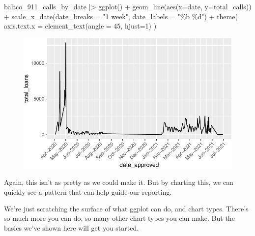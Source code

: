 \documentclass[
  letterpaper,
  DIV=11,
  numbers=noendperiod]{scrreprt}
\newenvironment{Shaded}{\begin{snugshade}}{\end{snugshade}}
\newcommand{\AttributeTok}[1]{\textcolor[rgb]{0.40,0.45,0.13}{#1}}
\newcommand{\DecValTok}[1]{\textcolor[rgb]{0.68,0.00,0.00}{#1}}
\newcommand{\FunctionTok}[1]{\textcolor[rgb]{0.28,0.35,0.67}{#1}}
\newcommand{\NormalTok}[1]{\textcolor[rgb]{0.00,0.23,0.31}{#1}}
\newcommand{\SpecialCharTok}[1]{\textcolor[rgb]{0.37,0.37,0.37}{#1}}
\newcommand{\StringTok}[1]{\textcolor[rgb]{0.13,0.47,0.30}{#1}}
\begin{document}
\begin{Shaded}
\begin{Highlighting}[]
\NormalTok{baltco\_911\_calls\_by\_date }\SpecialCharTok{|\textgreater{}}
  \FunctionTok{ggplot}\NormalTok{() }\SpecialCharTok{+} 
  \FunctionTok{geom\_line}\NormalTok{(}\FunctionTok{aes}\NormalTok{(}\AttributeTok{x=}\NormalTok{date, }\AttributeTok{y=}\NormalTok{total\_calls)) }\SpecialCharTok{+} 
  \FunctionTok{scale\_x\_date}\NormalTok{(}\AttributeTok{date\_breaks =} \StringTok{"1 week"}\NormalTok{, }\AttributeTok{date\_labels =} \StringTok{"\%b \%d"}\NormalTok{) }\SpecialCharTok{+}
  \FunctionTok{theme}\NormalTok{(}
    \AttributeTok{axis.text.x =} \FunctionTok{element\_text}\NormalTok{(}\AttributeTok{angle =} \DecValTok{45}\NormalTok{,  }\AttributeTok{hjust=}\DecValTok{1}\NormalTok{)}
\NormalTok{  )}
\end{Highlighting}
\end{Shaded}

\begin{figure}[H]

{\centering \includegraphics{./visualizing-for-reporting_files/figure-pdf/unnamed-chunk-15-1.pdf}

}

\end{figure}

Again, this isn't as pretty as we could make it. But by charting this,
we can quickly see a pattern that can help guide our reporting.

We're just scratching the surface of what ggplot can do, and chart
types. There's so much more you can do, so many other chart types you
can make. But the basics we've shown here will get you started.

\end{document}
